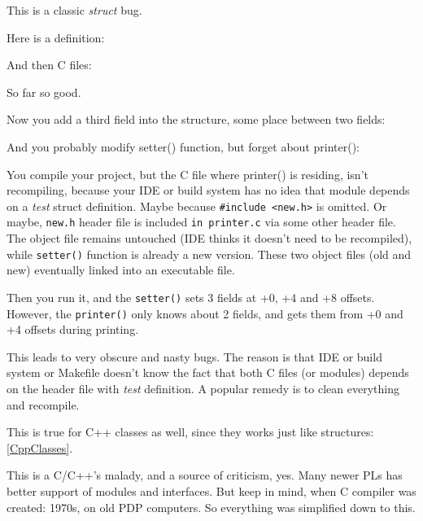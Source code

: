 
This is a classic \emph{struct} bug.

Here is a definition:



And then C files:





So far so good.

Now you add a third field into the structure, some place between two fields:



And you probably modify setter() function, but forget about printer():



You compile your project, but the C file where printer() is residing, isn't recompiling, because your \ac{IDE} or build system
has no idea that module depends on a \emph{test} struct definition.
Maybe because \verb|#include <new.h>| is omitted.
Or maybe, \verb|new.h| header file is included \verb|in printer.c| via some other header file.
The object file remains untouched (\ac{IDE} thinks it doesn't need to be recompiled),
while \verb|setter()| function is already a new version.
These two object files (old and new) eventually linked into an executable file.

Then you run it, and the \verb|setter()| sets 3 fields at +0, +4 and +8 offsets.
However, the \verb|printer()| only knows about 2 fields, and gets them from +0 and +4 offsets during printing.

This leads to very obscure and nasty bugs.
The reason is that \ac{IDE} or build system or Makefile doesn't know the fact that both C files (or modules) depends on the header
file with \emph{test} definition.
A popular remedy is to clean everything and recompile.

This is true for C++ classes as well, since they works just like structures: \ref{CppClasses}.

This is a C/C++'s malady, and a source of criticism, yes.
Many newer \ac{PL}s has better support of modules and interfaces.
But keep in mind, when C compiler was created: 1970s, on old PDP computers.
So everything was simplified down to this.


